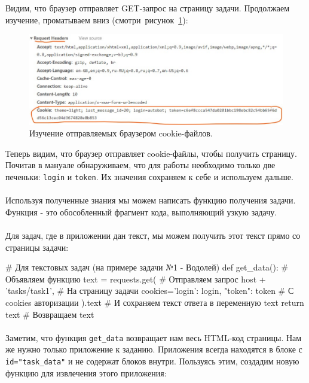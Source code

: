 \documentclass[12pt]{article}
\begin{document}
    Видим, что браузер отправляет GET-запрос на страницу задачи.
    Продолжаем изучение, проматываем вниз (смотри~рисунок~\ref{fig:browser2}):

    \begin{figure}[H]
        \includegraphics[width=\linewidth]{BrowserNetworkAnalysis2}
        \caption{Изучение отправляемых браузером cookie-файлов.}
        \label{fig:browser2}
    \end{figure}

    Теперь видим, что браузер отправляет cookie-файлы, чтобы получить страницу.
    Почитав в мануале обнаруживаем, что для работы необходимо только две печеньки: \verb|login| и \verb|token|.
    Их значения сохраняем к себе и используем дальше.
    \paragraph{}
    Используя полученные знания мы можем написать функцию получения задачи.
    Функция - это обособленный фрагмент кода, выполняющий узкую задачу.
    \paragraph{}
    Для задач, где в приложении дан текст, мы можем получить этот текст прямо со страницы задачи:

    \begin{pythoncode}
# Для текстовых задач (на примере задачи №1 - Водолей)
def get_data(): # Объявляем функцию
    text = requests.get(                          # Отправляем запрос
        host + 'tasks/task1',                     # На страницу задачи
        cookies={'login': login, "token": token}  # С cookies авторизации
    ).text # И сохраняем текст ответа в переменную text
    return text # Возвращаем text
    \end{pythoncode}

    \paragraph{}
    Заметим, что функция \verb|get_data| возвращает нам весь HTML-код страницы.
    Нам же нужно только приложение к заданию.
    Приложения всегда находятся в блоке с \verb|id="task_data"| и не содержат блоков внутри.
    Пользуясь этим, создадим новую функцию для извлечения этого приложения:
\end{document}
